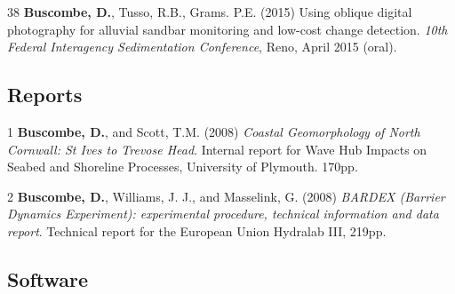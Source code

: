 \documentclass[margin,line]{resume}
\begin{document}
\begin{resume}
\begin{footnotesize}
\begin{list1}
        \item[38] {\bf Buscombe, D.}, Tusso, R.B., Grams. P.E. (2015) Using oblique digital photography for alluvial sandbar monitoring and low-cost change detection. {\sl 10th Federal Interagency Sedimentation Conference}, Reno, April 2015 (oral).

	\end{list1}

        \end{footnotesize}

	\subsection{\mysidestyle Reports}
        \begin{footnotesize}
	\begin{list1}
	 
	\item[1] {\bf Buscombe, D.}, and Scott, T.M. (2008) {\sl Coastal Geomorphology of North Cornwall: St Ives to Trevose Head}. Internal report for Wave Hub Impacts on Seabed and Shoreline Processes, University of Plymouth. 170pp.\\
	\item[2] {\bf Buscombe, D.}, Williams, J. J., and Masselink, G. (2008) {\sl BARDEX (Barrier Dynamics Experiment): experimental procedure, technical information and data report}. Technical report for the European Union Hydralab III, 219pp. 

	\end{list1}
        \end{footnotesize}

	\subsection{\mysidestyle Software}

        \begin{footnotesize}
	\begin{list1}
	 

\end{list1}
\end{footnotesize}
\end{resume}
\end{document}
